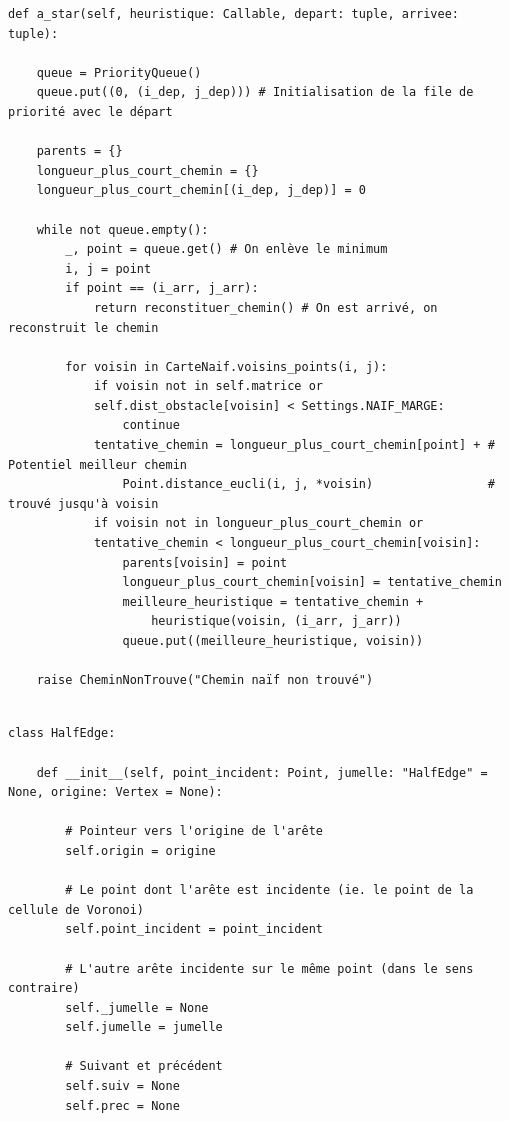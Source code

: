 \begin{frame}[fragile]
\begin{code}
\begin{verbatim}
def a_star(self, heuristique: Callable, depart: tuple, arrivee: tuple):

    queue = PriorityQueue()
    queue.put((0, (i_dep, j_dep))) # Initialisation de la file de priorité avec le départ

    parents = {}
    longueur_plus_court_chemin = {}
    longueur_plus_court_chemin[(i_dep, j_dep)] = 0

    while not queue.empty():
        _, point = queue.get() # On enlève le minimum
        i, j = point
        if point == (i_arr, j_arr):
            return reconstituer_chemin() # On est arrivé, on reconstruit le chemin

        for voisin in CarteNaif.voisins_points(i, j):
            if voisin not in self.matrice or
            self.dist_obstacle[voisin] < Settings.NAIF_MARGE:
                continue
            tentative_chemin = longueur_plus_court_chemin[point] + # Potentiel meilleur chemin
                Point.distance_eucli(i, j, *voisin)                # trouvé jusqu'à voisin
            if voisin not in longueur_plus_court_chemin or
            tentative_chemin < longueur_plus_court_chemin[voisin]:
                parents[voisin] = point
                longueur_plus_court_chemin[voisin] = tentative_chemin
                meilleure_heuristique = tentative_chemin +
                    heuristique(voisin, (i_arr, j_arr))
                queue.put((meilleure_heuristique, voisin))

    raise CheminNonTrouve("Chemin naïf non trouvé")
    

\end{verbatim}
\end{code}
\end{frame}

\begin{frame}[fragile]
\begin{code}
\begin{verbatim}
class HalfEdge:

    def __init__(self, point_incident: Point, jumelle: "HalfEdge" = None, origine: Vertex = None):

        # Pointeur vers l'origine de l'arête
        self.origin = origine

        # Le point dont l'arête est incidente (ie. le point de la cellule de Voronoi)
        self.point_incident = point_incident

        # L'autre arête incidente sur le même point (dans le sens contraire)
        self._jumelle = None
        self.jumelle = jumelle

        # Suivant et précédent
        self.suiv = None
        self.prec = None
\end{verbatim}
\end{code}
\end{frame}


